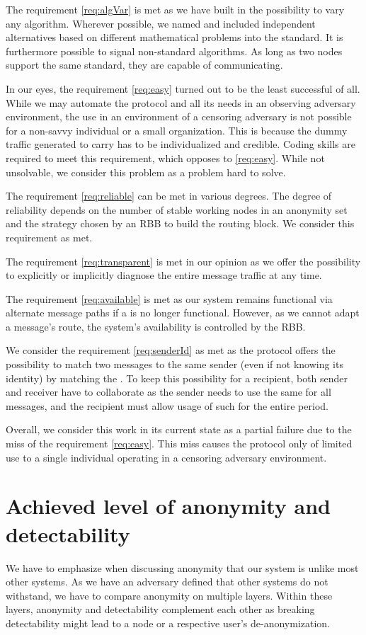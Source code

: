 The requirement \ref{req:algVar} is met as we have built in the possibility to vary any algorithm. Wherever possible, we named and included independent alternatives based on different mathematical problems into the standard. It is furthermore possible to signal non-standard algorithms. As long as two nodes support the same standard, they are capable of communicating.

In our eyes, the requirement \ref{req:easy} turned out to be the least successful of all. While we may automate the \MessageVortex{} protocol and all its needs in an observing adversary environment, the use in an environment of a censoring adversary is not possible for a non-savvy individual or a small organization. This is because the dummy traffic generated to carry \VortexMessages{} has to be individualized and credible. Coding skills are required to meet this requirement, which opposes to \ref{req:easy}. While not unsolvable, we consider this problem as a problem hard to solve.

The requirement \ref{req:reliable} can be met in various degrees. The degree of reliability depends on the number of stable working nodes in an anonymity set and the strategy chosen by an RBB to build the routing block. We consider this requirement as met. 

The requirement \ref{req:transparent} is met in our opinion as we offer the possibility to explicitly or implicitly diagnose the entire message traffic at any time. 

The requirement \ref{req:available} is met as our system remains functional via alternate message paths if a \VortexNode{} is no longer functional. However, as we cannot adapt a message's route, the system's availability is controlled by the RBB.

We consider the requirement \ref{req:senderId} as met as the protocol offers the possibility to match two messages to the same sender (even if not knowing its identity) by matching the . To keep this possibility for a recipient, both sender and receiver have to collaborate as the sender needs to use the same  for all messages, and the recipient must allow usage of such  for the entire period.

Overall, we consider this work in its current state as a partial failure due to the miss of the requirement \ref{req:easy}. This miss causes the protocol only of limited use to a single individual operating in a censoring adversary environment.

\section{Achieved level of anonymity and detectability}
We have to emphasize when discussing anonymity that our system is unlike most other systems. As we have an adversary defined that other systems do not withstand, we have to compare anonymity on multiple layers. Within these layers, anonymity and detectability complement each other as breaking detectability might lead to a node or a respective user's de-anonymization. 

